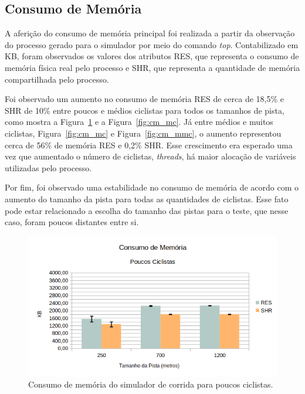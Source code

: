 \documentclass[12pt]{article}
\begin{document}
\subsection{Consumo de Memória}

A aferição do consumo de memória principal foi realizada a partir da observação do processo gerado para o simulador por meio do comando \textit{top}. Contabilizado em KB, foram observados os valores dos atributos RES, que representa o consumo de memória física real pelo processo e SHR, que representa a quantidade de memória compartilhada pelo processo.

Foi observado um aumento no consumo de memória RES de cerca de 18,5\% e SHR de 10\% entre poucos e médios ciclistas para todos os tamanhos de pista, como mostra a Figura~\ref{fig:cm_pc} e a Figura~\ref{fig:cm_mc}. Já entre médios e muitos ciclistas, Figura~\ref{fig:cm_mc} e Figura~\ref{fig:cm_mmc}, o aumento representou cerca de 56\% de memória RES e 0,2\% SHR. Esse crescimento era esperado uma vez que aumentado o número de ciclistas, \textit{threads}, há maior alocação de variáveis utilizadas pelo processo.

Por fim, foi observado uma estabilidade no consumo de memória de acordo com o aumento do tamanho da pista para todas as quantidades de ciclistas. Esse fato pode estar relacionado a escolha do tamanho das pistas para o teste, que nesse caso, foram poucos distantes entre si.

\begin{figure}[H]
	\centering
	\includegraphics[width=1\textwidth]{cm_pc.png}
	\caption{Consumo de memória do simulador de corrida para poucos ciclistas.}
	\label{fig:cm_pc}
\end{figure}
\end{document}
